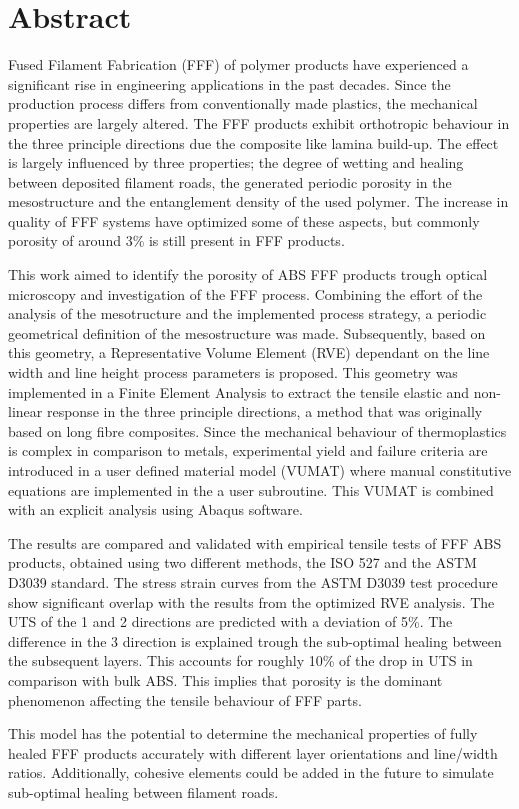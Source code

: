 \chapter*{Abstract}


Fused Filament Fabrication (FFF) of polymer products have experienced a significant rise in engineering applications in the past decades. Since the production process differs from conventionally made plastics, the mechanical properties are largely altered. The FFF products exhibit orthotropic behaviour in the three principle directions due the composite like lamina build-up. The effect is largely influenced by three properties; the degree of wetting and healing between deposited filament roads, the generated periodic porosity in the mesostructure and the entanglement density of the used polymer. The increase in quality of FFF systems have optimized some of these aspects, but commonly porosity of around 3\% is still present in FFF products.

This work aimed to identify the porosity of ABS FFF products trough optical microscopy and investigation of the FFF process. Combining the effort of the analysis of the mesotructure and the implemented process strategy, a periodic geometrical definition of the mesostructure was made. 
Subsequently, based on this geometry, a Representative Volume Element (RVE) dependant on the line width and line height process parameters is proposed. This geometry was implemented in a Finite Element Analysis to extract the tensile elastic and non-linear response in the three principle directions, a method that was originally based on long fibre composites. Since the mechanical behaviour of thermoplastics is complex in comparison to metals, experimental yield and failure criteria are introduced in a user defined material model (VUMAT) where manual constitutive equations are implemented in the a user subroutine. This VUMAT is combined with an explicit analysis using Abaqus software. 

The results are compared and validated with empirical tensile tests of FFF ABS products, obtained using two different methods, the ISO 527 and the ASTM D3039 standard. The stress strain curves from the ASTM D3039 test procedure show significant overlap with the results from the optimized RVE analysis. The UTS of the 1 and 2 directions are predicted with a deviation of 5\%. The difference in the 3 direction is explained trough the sub-optimal healing between the subsequent layers. This accounts for roughly 10\% of the drop in UTS in comparison with bulk ABS.  This implies that porosity is the dominant phenomenon affecting the tensile behaviour of FFF parts. 

This model has the potential to determine the mechanical properties of fully healed FFF products accurately with different layer orientations and line/width ratios. Additionally, cohesive elements could be added in the future to simulate sub-optimal healing between filament roads.    



